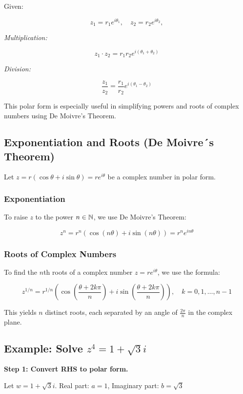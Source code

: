 Given:

\[
	z_1 = r_1 e^{i\theta_1}, \quad z_2 = r_2 e^{i\theta_2},
\]

\emph{Multiplication:}

\[
	z_1 \cdot z_2 = r_1 r_2 e^{i(\theta_1 + \theta_2)}
\]

\emph{Division:}
	      
\[
	\frac{z_1}{z_2} = \frac{r_1}{r_2} e^{i(\theta_1 - \theta_2)}
\]

This polar form is especially useful in simplifying powers and roots of complex numbers using De 
Moivre’s Theorem.

\subsection{Exponentiation and Roots (De Moivre´s Theorem)}

Let \( z = r(\cos \theta + i \sin \theta) = re^{i\theta} \) be a complex number in polar form.

\subsubsection{Exponentiation}

To raise \(z\) to the power \( n \in \mathbb{N} \), we use De Moivre’s Theorem:

\[
	z^n = r^n (\cos(n\theta) + i \sin(n\theta)) = r^n e^{in\theta}
\]

\subsubsection{Roots of Complex Numbers}

To find the \(n\)th roots of a complex number \( z = r e^{i\theta} \), we use the formula:

\[
	z^{1/n} = r^{1/n} \left( \cos\left( \frac{\theta + 2k\pi}{n} \right) + i \sin\left( \frac{\theta + 
	2k\pi}{n} \right) \right), \quad k = 0, 1, \ldots, n-1
\]

This yields \(n\) distinct roots, each separated by an angle of \( \frac{2\pi}{n} \) in 
the complex plane.

\subsection{Example: Solve \texorpdfstring{\( z^4 = 1 + \sqrt{3}i \)}{}}

\textbf{Step 1: Convert RHS to polar form.}

Let \( w = 1 + \sqrt{3}i \). Real part: \( a = 1 \), Imaginary part: \( b = \sqrt{3} \)

